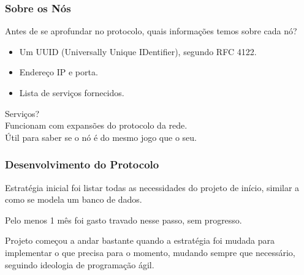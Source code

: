 \documentclass[brazil]{beamer}
\begin{document}
\begin{frame}
  \frametitle{Sobre os Nós}
  
  Antes de se aprofundar no protocolo, quais informações temos sobre cada nó?
  \pause
  \begin{itemize}
    \item Um UUID (Universally Unique IDentifier), segundo RFC 4122.
    \pause
    \item Endereço IP e porta.
    \pause
    \item Lista de serviços fornecidos.
  \end{itemize}
  \vspace{15pt}
  \pause
  Serviços? \\
  \pause
  Funcionam com expansões do protocolo da rede. \\
  Útil para saber se o nó é do mesmo jogo que o seu.
  
\end{frame}
\begin{frame}
  \frametitle{Desenvolvimento do Protocolo}
  
  Estratégia inicial foi listar todas as necessidades do projeto de início,
  similar a como se modela um banco de dados.
  
  \pause
  \vspace{10pt}
  
  Pelo menos 1 mês foi gasto travado nesse passo, sem progresso. \\
  
  \pause
  \vspace{20pt}
  
  Projeto começou a andar bastante quando a estratégia foi mudada para
  implementar o que precisa para o momento, mudando sempre que necessário,
  seguindo ideologia de programação ágil.
\end{frame}
\end{document}
